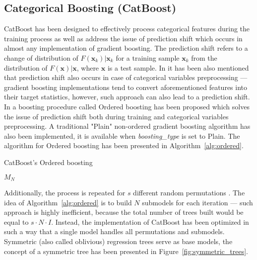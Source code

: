 \documentclass[magisterska, english]{pwr_wmat_praca_dyplomowa}
\theoremstyle{plain}
\numberwithin{theorem}{chapter}
\theoremstyle{definition}
\numberwithin{theorem}{chapter}
\begin{document}
\subsection{Categorical Boosting (CatBoost)}
CatBoost has been designed to effectively process categorical features during the training process as well as address the issue of prediction shift which occurs in almost any implementation of gradient boosting. The prediction shift refers to a change of distribution of $F(\mathbf{x}_k)|\mathbf{x}_k$ for a training sample $\mathbf{x}_k$ from the distribution of $F(\mathbf{x})|\mathbf{x}$, where $\mathbf{x}$ is a test sample. In \cite{catboost} it has been also mentioned that prediction shift also occurs in case of categorical variables preprocessing --- gradient boosting implementations tend to convert aforementioned features into their target statistics, however, such approach can also lead to a prediction shift. In \cite{catboost} a boosting procedure called Ordered boosting has been proposed which solves the issue of prediction shift both during training and categorical variables preprocessing. A traditional "Plain" non-ordered gradient boosting algorithm has also been implemented, it is available when \emph{boosting\_type} is set to Plain. The algorithm for Ordered boosting has been presented in Algorithm~\ref{alg:ordered}.

\begin{algorithm}[H]
\caption{CatBoost's Ordered boosting}\label{alg:ordered}
 \Return $M_N$
\end{algorithm}

Additionally, the process is repeated for $s$ different random permutations \cite{comparative_analysis}.
The idea of Algorithm~\ref{alg:ordered} is to build $N$ submodels for each iteration --- such approach is highly inefficient, because the total number of trees built would be equal to $s\cdot N\cdot I$. Instead, the implementation of CatBoost has been optimized in such a way that a single model handles all permutations and submodels. Symmetric (also called oblivious) regression trees serve as base models, the concept of a symmetric tree has been presented in Figure~\ref{fig:symmetric_trees}.
\end{document}
